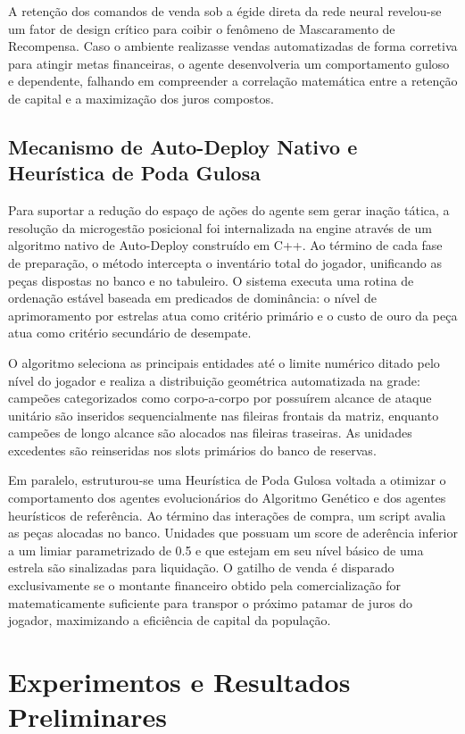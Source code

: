 \documentclass[12pt]{article}
\begin{document}
A retenção dos comandos de venda sob a égide direta da rede neural revelou-se um fator de design crítico para coibir o fenômeno de Mascaramento de Recompensa. Caso o ambiente realizasse vendas automatizadas de forma corretiva para atingir metas financeiras, o agente desenvolveria um comportamento guloso e dependente, falhando em compreender a correlação matemática entre a retenção de capital e a maximização dos juros compostos.

\subsection{Mecanismo de Auto-Deploy Nativo e Heurística de Poda Gulosa}
Para suportar a redução do espaço de ações do agente sem gerar inação tática, a resolução da microgestão posicional foi internalizada na engine através de um algoritmo nativo de Auto-Deploy construído em C++. Ao término de cada fase de preparação, o método intercepta o inventário total do jogador, unificando as peças dispostas no banco e no tabuleiro. O sistema executa uma rotina de ordenação estável baseada em predicados de dominância: o nível de aprimoramento por estrelas atua como critério primário e o custo de ouro da peça atua como critério secundário de desempate.

O algoritmo seleciona as principais entidades até o limite numérico ditado pelo nível do jogador e realiza a distribuição geométrica automatizada na grade: campeões categorizados como corpo-a-corpo por possuírem alcance de ataque unitário são inseridos sequencialmente nas fileiras frontais da matriz, enquanto campeões de longo alcance são alocados nas fileiras traseiras. As unidades excedentes são reinseridas nos slots primários do banco de reservas.

Em paralelo, estruturou-se uma Heurística de Poda Gulosa voltada a otimizar o comportamento dos agentes evolucionários do Algoritmo Genético e dos agentes heurísticos de referência. Ao término das interações de compra, um script avalia as peças alocadas no banco. Unidades que possuam um score de aderência inferior a um limiar parametrizado de 0.5 e que estejam em seu nível básico de uma estrela são sinalizadas para liquidação. O gatilho de venda é disparado exclusivamente se o montante financeiro obtido pela comercialização for matematicamente suficiente para transpor o próximo patamar de juros do jogador, maximizando a eficiência de capital da população.

\section{Experimentos e Resultados Preliminares} \label{sec:resultados}
\end{document}
